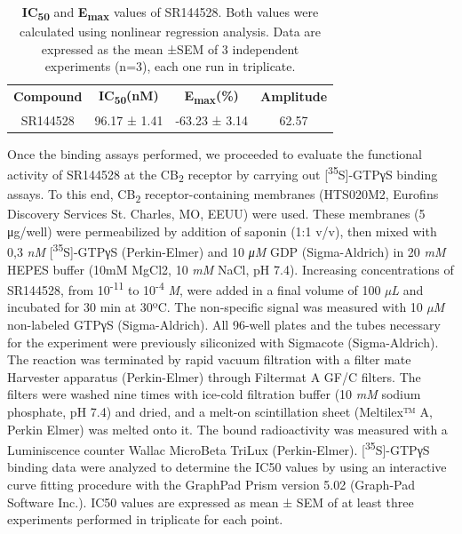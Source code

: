 \documentclass[empirical, authordate]{jote-new-article}
\begin{document}
\begin{table}[t]
  \begin{fullwidth}
    \caption{\textbf{IC}\textsubscript{\textbf{50}} and \textbf{E}\textsubscript{\textbf{max}}\textsubscript{ }values of SR144528. Both values were calculated using nonlinear regression analysis. Data are expressed as the mean ±SEM of 3 independent experiments (n=3), each one run in triplicate.}
    \label{tab:2}
    \begin{tabular}{c  c  c  c}
      \textbf{Compound } & \textbf{IC\textsubscript{50}(nM)} & \textbf{E\textsubscript{max}(\%) } & \textbf{Amplitude } \\
      SR144528           & 96.17 ± 1.41                      & -63.23 ± 3.14                      & 62.57               \\
    \end{tabular}
  \end{fullwidth}
\end{table}

Once the binding assays performed, we proceeded to evaluate the functional activity of SR144528 at the CB\textsubscript{2} receptor by carrying out [\textsuperscript{35}S]-GTPγS binding assays. To this end, CB\textsubscript{2} receptor-containing membranes (HTS020M2, Eurofins Discovery Services St. Charles, MO, EEUU) were used. These membranes (5 μg/well) were permeabilized by addition of saponin (1:1 v/v), then mixed with 0,3 \emph{nM} [\textsuperscript{35}S]-GTPγS (Perkin-Elmer) and 10 \emph{μM} GDP (Sigma-Aldrich) in 20 \emph{mM} HEPES buffer (10mM MgCl2, 10 \emph{mM} NaCl, pH 7.4). Increasing concentrations of SR144528, from 10\textsuperscript{-11} to 10\textsuperscript{-4} \emph{M}, were added in a final volume of 100 \emph{µL} and incubated for 30 min at 30ºC. The non-specific signal was measured with 10 \emph{µM} non-labeled GTPγS (Sigma-Aldrich). All 96-well plates and the tubes necessary for the experiment were previously siliconized with Sigmacote (Sigma-Aldrich). The reaction was terminated by rapid vacuum filtration with a filter mate Harvester apparatus (Perkin-Elmer) through Filtermat A GF/C filters. The filters were washed nine times with ice-cold filtration buffer (10 \emph{mM} sodium phosphate, pH 7.4) and dried, and a melt-on scintillation sheet (Meltilex™ A, Perkin Elmer) was melted onto it. The bound radioactivity was measured with a Luminiscence counter Wallac MicroBeta TriLux (Perkin-Elmer). [\textsuperscript{35}S]-GTPγS binding data were analyzed to determine the IC50 values by using an interactive curve fitting procedure with the GraphPad Prism version 5.02 (Graph-Pad Software Inc.). IC50 values are expressed as mean ± SEM of at least three experiments performed in triplicate for each point.
\end{document}
